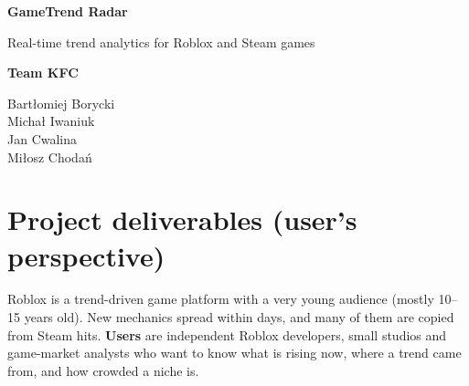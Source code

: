 \documentclass[10pt,a4paper]{article}
\begin{document}
\begin{titlepage}
\centering
\vspace*{\fill}
{\Huge\bfseries\color{kfcblue} GameTrend Radar\par}
\vspace{0.4cm}
{\Large Real-time trend analytics for Roblox and Steam games\par}
\vspace{2.5cm}
{\Large\bfseries Team KFC\par}
\vspace{0.5cm}
{\large
Bart\l{}omiej Borycki\\[3pt]
Micha\l{} Iwaniuk\\[3pt]
Jan Cwalina\\[3pt]
Mi\l{}osz Choda\'n\par}
\vspace*{\fill}
\end{titlepage}

\section{Project deliverables (user's perspective)}
Roblox is a trend-driven game platform with a very young audience (mostly 10--15 years old). New mechanics spread within days, and many of them are copied from Steam hits. \textbf{Users} are independent Roblox developers, small studios and game-market analysts who want to know what is rising now, where a trend came from, and how crowded a niche is.
\end{document}
